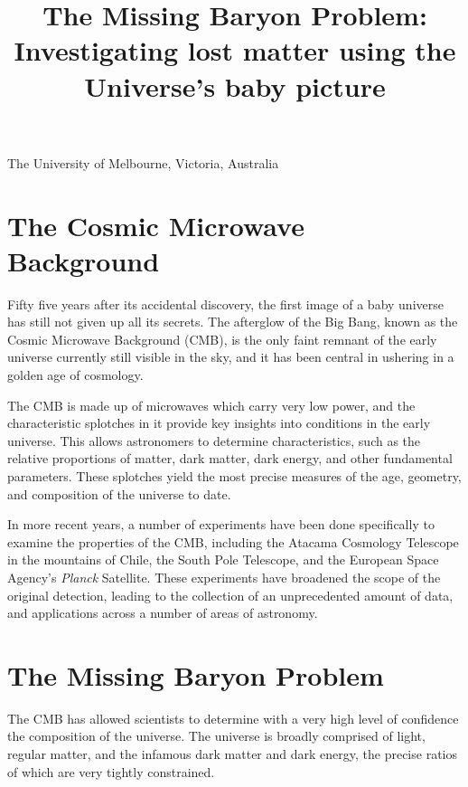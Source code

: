 \documentclass{nature}
\title{The Missing Baryon Problem: Investigating lost matter using the Universe's baby picture}
\author{}
\begin{document}
\maketitle

\begin{affiliations}
 \item The University of Melbourne, Victoria, Australia
\end{affiliations}



\section{The Cosmic Microwave Background}
Fifty five years after its accidental discovery, the first image of a baby universe has still not given up all its secrets. The afterglow of the Big Bang, known as the Cosmic Microwave Background (CMB), is the only faint remnant of the early universe currently still visible in the sky, and it has been central in ushering in a golden age of cosmology.  

The CMB is made up of microwaves which carry very low power, and the characteristic splotches in it provide key insights into conditions in the early universe. This allows astronomers to determine characteristics, such as the relative proportions of matter, dark matter, dark energy, and other fundamental parameters. These splotches yield the most precise measures of the age, geometry, and composition of the universe to date. 

In more recent years, a number of experiments have been done specifically to examine the properties of the CMB, including the Atacama Cosmology Telescope in the mountains of Chile, the South Pole Telescope, and the European Space Agency's \textit{Planck} Satellite. These experiments have broadened the scope of the original detection, leading to the collection of an unprecedented amount of data, and applications across a number of areas of astronomy. 

\section{The Missing Baryon Problem}
The CMB has allowed scientists to determine with a very high level of confidence the composition of the universe. The universe is broadly comprised of light, regular matter, and the infamous dark matter and dark energy, the precise ratios of which are very tightly constrained. 
\end{document}
